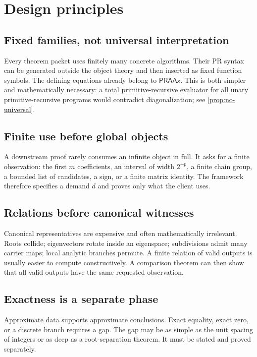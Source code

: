 \documentclass[11pt]{article}
\newcommand{\PRAAx}{\mathsf{PRAAx}}
\begin{document}
\section{Design principles}

\subsection{Fixed families, not universal interpretation}

Every theorem packet uses finitely many concrete algorithms.  Their PR syntax
can be generated outside the object theory and then inserted as fixed function
symbols.  The defining equations already belong to \(\PRAAx\).  This is both
simpler and mathematically necessary: a total primitive-recursive evaluator
for all unary primitive-recursive programs would contradict diagonalization;
see \cref{prop:no-universal}.

\subsection{Finite use before global objects}

A downstream proof rarely consumes an infinite object in full.  It asks for a
finite observation: the first \(m\) coefficients, an interval of width
\(2^{-p}\), a finite chain group, a bounded list of candidates, a sign, or a
finite matrix identity.  The framework therefore specifies a demand
\(d\) and proves only what the client uses.

\subsection{Relations before canonical witnesses}

Canonical representatives are expensive and often mathematically irrelevant.
Roots collide; eigenvectors rotate inside an eigenspace; subdivisions admit
many carrier maps; local analytic branches permute.  A finite relation of valid
outputs is usually easier to compute constructively.  A comparison theorem can
then show that all valid outputs have the same requested observation.

\subsection{Exactness is a separate phase}

Approximate data supports approximate conclusions.  Exact equality, exact zero,
or a discrete branch requires a gap.  The gap may be as simple as the unit
spacing of integers or as deep as a root-separation theorem.  It must be stated
and proved separately.
\end{document}
